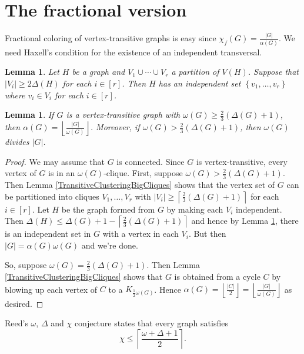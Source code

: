 \documentclass[12pt]{article}
\theoremstyle{plain}
\newtheorem{lem}[thm]{Lemma}
\theoremstyle{definition}
\theoremstyle{remark}
\newcommand{\set}[1]{\left\{ #1 \right\}}
\newcommand{\card}[1]{\left|#1\right|}
\newcommand{\ceil}[1]{\left\lceil#1\right\rceil}
\newcommand{\floor}[1]{\left\lfloor#1\right\rfloor}
\newcommand{\irange}[1]{\left[#1\right]}
\newcommand{\parens}[1]{\left( #1 \right)}
\begin{document}
\section{The fractional version}
Fractional coloring of vertex-transitive graphs is easy since $\chi_f(G) = \frac{|G|}{\alpha(G)}$. We need Haxell's condition \cite{haxell2001note} for the existence of an independent transversal.

\begin{lem}\label{HaxellTransversal}
Let $H$ be a graph and $V_1 \cup \cdots \cup V_r$ a partition of $V(H)$. 
Suppose that $\card{V_i} \geq 2\Delta(H)$ for each $i \in \irange{r}$. Then $H$ has an independent set $\set{v_1, \ldots, v_r}$
where $v_i \in V_i$ for each $i \in \irange{r}$.
\end{lem}

\begin{lem}\label{TransitiveFractionalColoringWithBigCliques}
If $G$ is a vertex-transitive graph with $\omega(G) \ge \frac23 \parens{\Delta(G) + 1}$, then $\alpha(G) = \floor{\frac{|G|}{\omega(G)}}$.  Moreover, if $\omega(G) > \frac23 \parens{\Delta(G) + 1}$, then $\omega(G)$ divides $|G|$.
\end{lem}
\begin{proof}
We may assume that $G$ is connected. Since $G$ is vertex-transitive, every vertex of $G$ is in an $\omega(G)$-clique. First, suppose $\omega(G) > \frac23 \parens{\Delta(G) + 1}$.  Then Lemma \ref{TransitiveClusteringBigCliques} shows that the vertex set of $G$ can be partitioned into cliques $V_1, \ldots, V_r$ with $|V_i| \ge \ceil{\frac23 \parens{\Delta(G) + 1}}$ for each $i \in \irange{r}$.  Let $H$ be the graph formed from $G$ by making each $V_i$ independent.  Then $\Delta(H) \le \Delta(G) + 1 - \ceil{\frac23 \parens{\Delta(G) + 1}}$ and hence by Lemma \ref{HaxellTransversal}, there is an independent set in $G$ with a vertex in each $V_i$.  But then $|G| = \alpha(G)\omega(G)$ and we're done.

So, suppose $\omega(G) = \frac23 \parens{\Delta(G) + 1}$.  Then Lemma \ref{TransitiveClusteringBigCliques} shows that $G$ is obtained from a cycle $C$ by blowing up each vertex of $C$ to a $K_{\frac12 \omega(G)}$.  Hence $\alpha(G) = \floor{\frac{|C|}{2}} = \floor{\frac{|G|}{\omega(G)}}$ as desired.
\end{proof}

Reed's $\omega$, $\Delta$ and $\chi$ conjecture states that every graph satisfies
\[\chi \leq\ceil{\frac{\omega + \Delta + 1}{2}}.\]
\end{document}
